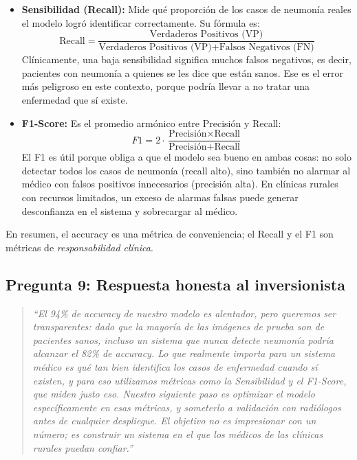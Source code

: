 \documentclass[12pt, letterpaper]{article}
\begin{document}
\begin{itemize}[leftmargin=1.5cm]
    \item \textbf{Sensibilidad (Recall):} Mide qué proporción de los casos de neumonía reales
    el modelo logró identificar correctamente. Su fórmula es:
    \[
    \text{Recall} = \frac{\text{Verdaderos Positivos (VP)}}{\text{Verdaderos Positivos (VP)} + \text{Falsos Negativos (FN)}}
    \]
    Clínicamente, una baja sensibilidad significa muchos falsos negativos, es decir, pacientes con
    neumonía a quienes se les dice que están sanos. Ese es el error más peligroso en este contexto,
    porque podría llevar a no tratar una enfermedad que sí existe.

    \item \textbf{F1-Score:} Es el promedio armónico entre Precisión y Recall:
    \[
    F1 = 2 \cdot \frac{\text{Precisión} \times \text{Recall}}{\text{Precisión} + \text{Recall}}
    \]
    El F1 es útil porque obliga a que el modelo sea bueno en ambas cosas: no solo detectar todos
    los casos de neumonía (recall alto), sino también no alarmar al médico con falsos positivos
    innecesarios (precisión alta). En clínicas rurales con recursos limitados, un exceso de
    alarmas falsas puede generar desconfianza en el sistema y sobrecargar al médico.
\end{itemize}

En resumen, el accuracy es una métrica de conveniencia; el Recall y el F1 son métricas de
\textit{responsabilidad clínica}.

\subsection{Pregunta 9: Respuesta honesta al inversionista}

\begin{quote}
\itshape
``El 94\% de accuracy de nuestro modelo es alentador, pero queremos ser transparentes: dado que
la mayoría de las imágenes de prueba son de pacientes sanos, incluso un sistema que nunca detecte
neumonía podría alcanzar el 82\% de accuracy. Lo que realmente importa para un sistema médico es
qué tan bien identifica los casos de enfermedad cuando sí existen, y para eso utilizamos métricas
como la Sensibilidad y el F1-Score, que miden justo eso. Nuestro siguiente paso es optimizar el
modelo específicamente en esas métricas, y someterlo a validación con radiólogos antes de cualquier
despliegue. El objetivo no es impresionar con un número; es construir un sistema en el que los
médicos de las clínicas rurales puedan confiar.''
\end{quote}
\end{document}
